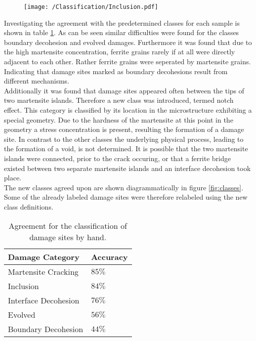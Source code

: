 \begin{figure}
\centering
\texttt{[image: /Classification/Inclusion.pdf]}

\end{figure}

Investigating the agreement with the predetermined classes for each sample is shown in table \ref{tab:Reliability}. As can be seen similar difficulties were found for the classes boundary decohesion and evolved damages. Furthermore it was found that due to the high martensite concentration, ferrite grains rarely if at all were directly adjacent to each other. Rather ferrite grains were seperated by martensite grains. Indicating that damage sites marked as boundary decohesions result from different mechanisms. \\

Additionally it was found that damage sites appeared often between the tips of two martensite islands. Therefore a new class was introduced, termed notch effect. This category is classified by its location in the microstructure exhibiting a special geometry. Due to the hardness of the martensite at this point in the geometry a stress concentration is present, resulting the formation of a damage site. In contrast to the other classes the underlying physical process, leading to the formation of a void, is not determined. It is possible that the two martensite islands were connected, prior to the crack occuring, or that a ferrite bridge existed between two separate martensite islands and an interface decohesion took place. \\

The new classes agreed upon are shown diagrammatically in figure \ref{fig:classes}. Some of the already labeled damage sites were therefore relabeled using the new class definitions. 

\begin{table}[H]
 \begin{center}
  \begin{tabular}{@{} *2l @{}} \toprule[2pt]
   Damage Category & Accuracy \\\midrule
   Martensite Cracking & $85 \%$   \\ 
   Inclusion  & $84 \%$ \\ 
   Interface Decohesion  & $76 \% $ \\
   Evolved & $56\%$ \\
   Boundary Decohesion & $44 \%$ \\ \bottomrule[2pt]

  \end{tabular}
 \end{center}
 \caption{Agreement for the classification of damage sites by hand. }
 \label{tab:Reliability}
\end{table}

